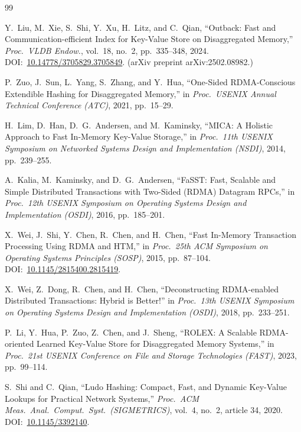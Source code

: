 \documentclass[conference]{IEEEtran}
\begin{document}
\begin{thebibliography}{99}

Y.~Liu, M.~Xie, S.~Shi, Y.~Xu, H.~Litz, and C.~Qian,
``Outback: Fast and Communication-efficient Index for Key-Value Store on
  Disaggregated Memory,''
\emph{Proc.\ VLDB Endow.}, vol.~18, no.~2, pp.~335--348, 2024.
DOI:~\href{https://doi.org/10.14778/3705829.3705849}{10.14778/3705829.3705849}.
(arXiv preprint arXiv:2502.08982.)

P.~Zuo, J.~Sun, L.~Yang, S.~Zhang, and Y.~Hua,
``One-Sided {RDMA}-Conscious Extendible Hashing for Disaggregated Memory,''
in \emph{Proc.\ USENIX Annual Technical Conference (ATC)}, 2021, pp.~15--29.

H.~Lim, D.~Han, D.~G.~Andersen, and M.~Kaminsky,
``{MICA}: A Holistic Approach to Fast In-Memory Key-Value Storage,''
in \emph{Proc.\ 11th USENIX Symposium on Networked Systems Design and
  Implementation (NSDI)}, 2014, pp.~239--255.

A.~Kalia, M.~Kaminsky, and D.~G.~Andersen,
``{FaSST}: Fast, Scalable and Simple Distributed Transactions with
  Two-Sided {(RDMA)} Datagram {RPCs},''
in \emph{Proc.\ 12th USENIX Symposium on Operating Systems Design and
  Implementation (OSDI)}, 2016, pp.~185--201.

X.~Wei, J.~Shi, Y.~Chen, R.~Chen, and H.~Chen,
``Fast In-Memory Transaction Processing Using {RDMA} and {HTM},''
in \emph{Proc.\ 25th ACM Symposium on Operating Systems Principles (SOSP)},
  2015, pp.~87--104.
DOI:~\href{https://doi.org/10.1145/2815400.2815419}{10.1145/2815400.2815419}.

X.~Wei, Z.~Dong, R.~Chen, and H.~Chen,
``Deconstructing {RDMA}-enabled Distributed Transactions: Hybrid is Better!''
in \emph{Proc.\ 13th USENIX Symposium on Operating Systems Design and
  Implementation (OSDI)}, 2018, pp.~233--251.

P.~Li, Y.~Hua, P.~Zuo, Z.~Chen, and J.~Sheng,
``{ROLEX}: A Scalable {RDMA}-oriented Learned Key-Value Store for
  Disaggregated Memory Systems,''
in \emph{Proc.\ 21st USENIX Conference on File and Storage Technologies
  (FAST)}, 2023, pp.~99--114.

S.~Shi and C.~Qian,
``Ludo Hashing: Compact, Fast, and Dynamic Key-Value Lookups for
  Practical Network Systems,''
\emph{Proc.\ ACM Meas.\ Anal.\ Comput.\ Syst.\ (SIGMETRICS)}, vol.~4, no.~2,
  article 34, 2020.
DOI:~\href{https://doi.org/10.1145/3392140}{10.1145/3392140}.


\end{thebibliography}
\end{document}
